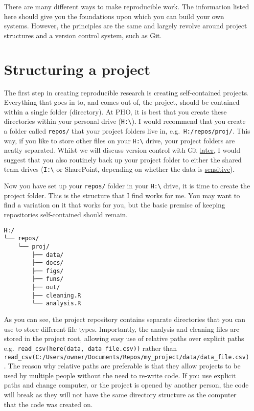 \documentclass[]{book}
\begin{document}
There are many different ways to make reproducible work. The information listed here should give you the foundations upon which you can build your own systems. However, the principles are the same and largely revolve around project structures and a version control system, such as Git.

\hypertarget{structuring-a-project}{%
\section{Structuring a project}\label{structuring-a-project}}

The first step in creating reproducible research is creating self-contained projects. Everything that goes in to, and comes out of, the project, should be contained within a single folder (directory). At PHO, it is best that you create these directories within your personal drive (\texttt{H:\textbackslash{}}). I would recommend that you create a folder called \texttt{repos/} that your project folders live in, e.g.~\texttt{H:/repos/proj/}. This way, if you like to store other files on your \texttt{H:\textbackslash{}} drive, your project folders are neatly separated. Whilst we will discuss version control with Git \protect\hyperlink{git}{later}, I would suggest that you also routinely back up your project folder to either the shared team drives (\texttt{I:\textbackslash{}} or SharePoint, depending on whether the data is \protect\hyperlink{sensitive-data}{sensitive}).

Now you have set up your \texttt{repos/} folder in your \texttt{H:\textbackslash{}} drive, it is time to create the project folder. This is the structure that I find works for me. You may want to find a variation on it that works for you, but the basic premise of keeping repositories self-contained should remain.

\begin{verbatim}
H:/
└── repos/
    └── proj/
        ├── data/
        ├── docs/
        ├── figs/
        ├── funs/
        ├── out/
        ├── cleaning.R
        └── analysis.R
\end{verbatim}

As you can see, the project repository contains separate directories that you can use to store different file types. Importantly, the analysis and cleaning files are stored in the project root, allowing easy use of relative paths over explicit paths e.g.~\texttt{read\_csv(here(\textquotesingle{}data\textquotesingle{},\ \textquotesingle{}data\_file.csv\textquotesingle{}))} rather than \texttt{read\_csv(\textquotesingle{}C:/Users/owner/Documents/Repos/my\_project/data/data\_file.csv\textquotesingle{})}. The reason why relative paths are preferable is that they allow projects to be used by multiple people without the need to re-write code. If you use explicit paths and change computer, or the project is opened by another person, the code will break as they will not have the same directory structure as the computer that the code was created on.
\end{document}
